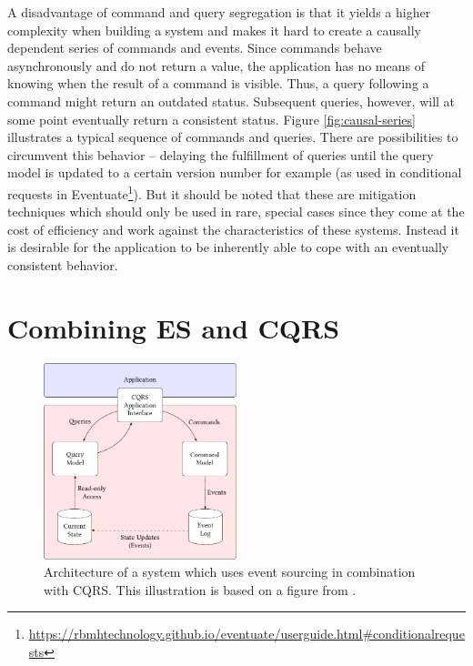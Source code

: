 A disadvantage of command and query segregation is that it yields a higher 
complexity when building a system and makes it hard to create a causally 
dependent series of commands and events. 
Since commands behave asynchronously and do not return a value, the application 
has no means of knowing when the result of a command is visible.
Thus, a query following a command might return an outdated status.
Subsequent queries, however, will at some point eventually return a consistent 
status. Figure \ref{fig:causal-series} illustrates a typical sequence of commands 
and queries. There are possibilities to circumvent this behavior -- delaying the 
fulfillment of queries until the query model is updated to a certain version 
number for example (as used in conditional requests in 
Eventuate\footnote[1]{\href{https://rbmhtechnology.github.io/eventuate/user\-guide.html\#conditional\-requests}{https://rbmhtechnology.github.io/eventuate/user\-guide.html\#conditional\-requests}}).
%
But it should be noted that these are mitigation techniques which should only 
be used in rare, special cases since they come at the cost of efficiency 
and work against the characteristics of these systems. Instead it is desirable 
for the application to be inherently able to cope with an eventually consistent 
behavior.


\section{Combining ES and CQRS}
\label{sec:es+cqrs}

\begin{figure}[t]
	\centering
	\includegraphics[width=0.5\textwidth]
		{../illustrations/es-cqrs-logic.pdf}

	\caption{
		Architecture of a system which uses event sourcing in 
		combination with CQRS. 
		This illustration is based on a figure from \cite{Erb2014}.}
	\label{fig:escqrs}
\end{figure}

